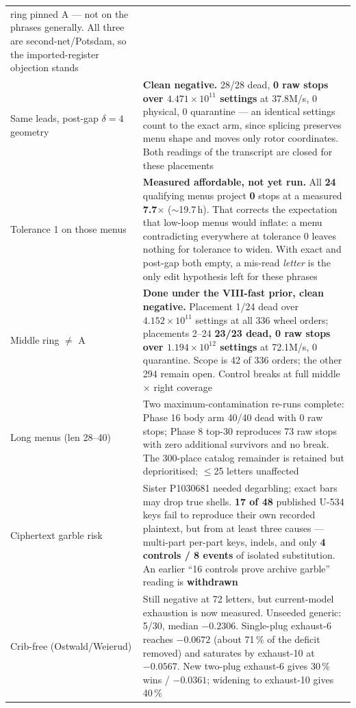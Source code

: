 \documentclass[11pt,a4paper]{article}
\begin{document}
{\begin{longtable}{@{}p{}p{}@{}}
  ring pinned A --- not on the phrases generally. All three are second-net/Potsdam, so the
  imported-register objection stands \\
Same leads, post-gap $\delta{=}4$ geometry & \textbf{Clean negative.} 28/28 dead, \textbf{0 raw
  stops over $4.471\times10^{11}$ settings} at 37.8M/s, 0 physical, 0 quarantine --- an identical
  settings count to the exact arm, since splicing preserves menu shape and moves only rotor
  coordinates. Both readings of the transcript are closed for these placements \\
Tolerance 1 on those menus & \textbf{Measured affordable, not yet run.} All \textbf{24} qualifying
  menus project \textbf{0} stops at a measured \textbf{7.7$\times$} ($\sim$19.7\,h). That corrects
  the expectation that low-loop menus would inflate: a menu contradicting everywhere at tolerance 0
  leaves nothing for tolerance to widen. With exact and post-gap both empty, a mis-read
  \emph{letter} is the only edit hypothesis left for these phrases \\
Middle ring $\ne$ A & \textbf{Done under the VIII-fast prior, clean negative.}
  Placement 1/24 dead over $4.152\times10^{11}$ settings at all 336 wheel orders;
  placements 2--24 \textbf{23/23 dead, 0 raw stops over $1.194\times10^{12}$
  settings} at 72.1M/s, 0 quarantine. Scope is 42 of 336 orders; the other 294
  remain open. Control breaks at full middle $\times$ right coverage \\
Long menus (len 28--40) & Two maximum-contamination re-runs complete: Phase 16 body arm
  40/40 dead with 0 raw stops; Phase 8 top-30 reproduces 73 raw stops with zero additional
  survivors and no break. The 300-place catalog remainder is retained but deprioritised;
  $\le$25 letters unaffected \\
Ciphertext garble risk & Sister P1030681 needed degarbling; exact bars may drop true shells.
  \textbf{17 of 48} published U-534 keys fail to reproduce their own recorded plaintext, but
  from at least three causes --- multi-part per-part keys, indels, and only \textbf{4
  controls / 8 events} of isolated substitution. An earlier ``16 controls prove archive
  garble'' reading is \textbf{withdrawn} \\
Crib-free (Ostwald/Weierud) & Still negative at 72 letters, but current-model exhaustion is now
  measured. Unseeded generic: 5/30, median $-0.2306$. Single-plug exhaust-6 reaches
  $-0.0672$ (about 71\,\% of the deficit removed) and saturates by exhaust-10 at $-0.0567$.
  New two-plug exhaust-6 gives 30\,\% wins / $-0.0361$; widening to exhaust-10 gives 40\,\%

\end{longtable}}
\end{document}
